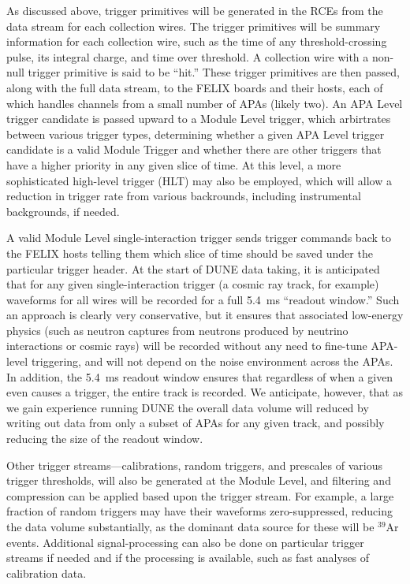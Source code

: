 	As discussed above, trigger primitives will be generated in the RCEs
from the data stream for each collection wires.  The trigger primitives will be
summary information for each collection wire, such as the time of any
threshold-crossing pulse, its integral charge, and time over threshold.  A
collection wire with a non-null trigger primitive is said to be ``hit.''  These
trigger primitives are then passed, along with the full data stream, to the
FELIX boards and their hosts, each of which handles channels from a small
number of APAs (likely two).  An APA Level trigger candidate is passed upward to
a Module Level trigger, which arbirtrates between various trigger types,
determining whether a given APA Level trigger candidate is a valid Module
Trigger and whether there are other triggers that have a higher priority in any
given slice of time.  At this level, a more sophisticated high-level trigger
(HLT) may also be employed, which will allow a reduction in trigger rate from
various backrounds, including instrumental backgrounds, if needed. 

	A valid Module Level single-interaction trigger sends trigger commands
back to the FELIX hosts telling them which slice of time should be saved under
the particular trigger header.  At the start of DUNE data taking, it is
anticipated that for any given single-interaction trigger (a cosmic ray track,
for example) waveforms for all wires will be recorded for a full 5.4~ms
``readout window.'' Such an approach is clearly very conservative, but it
ensures that associated low-energy physics (such as neutron captures from
neutrons produced by neutrino interactions or cosmic rays) will be recorded
without any need to fine-tune APA-level triggering, and will not depend on
the noise environment across the APAs. In addition, the 5.4~ms readout window
ensures that regardless of when a given even causes a trigger, the entire track
is recorded.  We anticipate, however, that as we gain experience running DUNE
the overall data volume will reduced by writing out data from only a
subset of APAs for any given track, and possibly reducing the size of the
readout window.

	Other trigger streams---calibrations, random triggers, and prescales of
various trigger thresholds, will also be generated at the Module Level, and
filtering and compression can be applied based upon the trigger stream. For
example, a large fraction of random triggers may have their waveforms
zero-suppressed, reducing the data volume substantially, as the dominant data
source for these will be $^{39}$Ar events. Additional signal-processing can
also be done on particular trigger streams if needed and if the processing is
available, such as fast analyses of calibration data.

